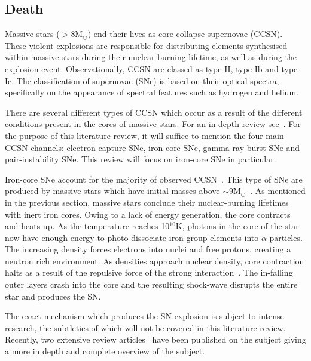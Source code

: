 

\subsection{Death} %
\label{sub:death}

Massive stars ($>$8M$_{\odot}$) end their lives as core-collapse supernovae (CCSN).
These violent explosions are responsible for distributing elements synthesised within massive stars during their nuclear-burning lifetime, as well as during the explosion event.
Observationally, CCSN are classed as type II, type Ib and type Ic.\footnotemark
{}
The classification of supernovae (SNe) is based on their optical spectra, specifically on the appearance of spectral features such as hydrogen and helium.

There are several different types of CCSN which occur as a result of the different conditions present in the cores of massive stars.
For an in depth review see~\cite{Janka12}.
For the purpose of this literature review, it will suffice to mention the four main CCSN channels: electron-capture SNe, iron-core SNe, gamma-ray burst SNe and pair-instability SNe.
This review will focus on iron-core SNe in particular.

Iron-core SNe account for the majority of observed CCSN~\citep{Smartt09,Janka12,Eldridge13}.
This type of SNe are produced by massive stars which have initial masses above $\sim$9M$_{\odot}$~\citep{Poelarends08}.
As mentioned in the previous section, massive stars conclude their nuclear-burning lifetimes with inert iron cores.
Owing to a lack of energy generation, the core contracts and heats up.
As the temperature reaches 10$^{10}$K, photons in the core of the star now have enough energy to photo-dissociate iron-group elements into $\alpha$ particles.
The increasing density forces electrons into nuclei and free protons, creating a neutron rich environment.
As densities approach nuclear density, core contraction halts as a result of the repulsive force of the strong interaction~\citep{Janka12}.
The in-falling outer layers crash into the core and the resulting shock-wave disrupts the entire star and produces the SN.

The exact mechanism which produces the SN explosion is subject to intense research, the subtleties of which will not be covered in this literature review.
Recently, two extensive review articles~\citep{Janka12, Burrows13} have been published on the subject giving a more in depth and complete overview of the subject.

